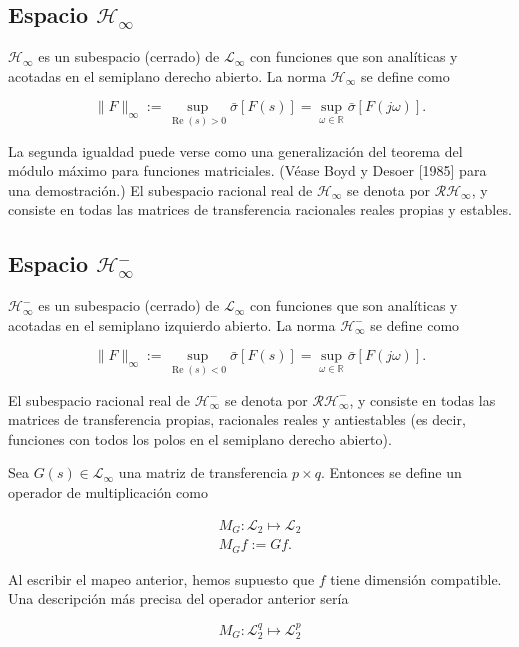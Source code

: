 \subsection*{Espacio $\mathcal{H}_{\infty}$}
$\mathcal{H}_{\infty}$ es un subespacio (cerrado) de $\mathcal{L}_{\infty}$ con funciones que son analíticas y acotadas en el semiplano derecho abierto. La norma $\mathcal{H}_{\infty}$ se define como

$$
\|F\|_{\infty}:=\sup _{\operatorname{Re}(s)>0} \bar{\sigma}[F(s)]=\sup _{\omega \in \mathbb{R}} \bar{\sigma}[F(j \omega)] .
$$

La segunda igualdad puede verse como una generalización del teorema del módulo máximo para funciones matriciales. (Véase Boyd y Desoer [1985] para una demostración.) El subespacio racional real de $\mathcal{H}_{\infty}$ se denota por $\mathcal{R} \mathcal{H}_{\infty}$, y consiste en todas las matrices de transferencia racionales reales propias y estables.

\subsection*{Espacio $\mathcal{H}_{\infty}^{-}$}
$\mathcal{H}_{\infty}^{-}$ es un subespacio (cerrado) de $\mathcal{L}_{\infty}$ con funciones que son analíticas y acotadas en el semiplano izquierdo abierto. La norma $\mathcal{H}_{\infty}^{-}$ se define como

$$
\|F\|_{\infty}:=\sup _{\operatorname{Re}(s)<0} \bar{\sigma}[F(s)]=\sup _{\omega \in \mathbb{R}} \bar{\sigma}[F(j \omega)] .
$$

El subespacio racional real de $\mathcal{H}_{\infty}^{-}$ se denota por $\mathcal{R H}_{\infty}^{-}$, y consiste en todas las matrices de transferencia propias, racionales reales y antiestables (es decir, funciones con todos los polos en el semiplano derecho abierto).

Sea $G(s) \in \mathcal{L}_{\infty}$ una matriz de transferencia $p \times q$. Entonces se define un operador de multiplicación como

$$
\begin{aligned}
M_{G}: \mathcal{L}_{2} \longmapsto \mathcal{L}_{2} \\
M_{G} f:=G f .
\end{aligned}
$$

Al escribir el mapeo anterior, hemos supuesto que $f$ tiene dimensión compatible. Una descripción más precisa del operador anterior sería

$$
M_{G}: \mathcal{L}_{2}^{q} \longmapsto \mathcal{L}_{2}^{p}
$$

